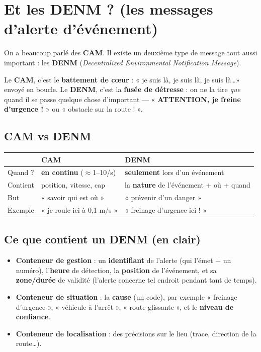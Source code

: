 \documentclass[a4paper,11pt]{article}
\begin{document}
\section{Et les DENM ? (les messages d'alerte d'événement)}
On a beaucoup parlé des \textbf{CAM}. Il existe un deuxième type de message tout
aussi important : les \textbf{DENM} (\emph{Decentralized Environmental Notification
Message}).

\begin{analogie}
Le \textbf{CAM}, c'est le \textbf{battement de cœur} : « je suis là, je suis là, je
suis là\ldots » envoyé en boucle. Le \textbf{DENM}, c'est la \textbf{fusée de
détresse} : on ne la tire \emph{que} quand il se passe quelque chose
d'important — « \textbf{ATTENTION, je freine d'urgence !} » ou « obstacle sur la
route ! ».
\end{analogie}

\subsection{CAM vs DENM}
\begin{center}
\begin{tabularx}{\textwidth}{@{}l X X@{}}
\toprule
 & \textbf{CAM} & \textbf{DENM} \\
\midrule
Quand ? & \textbf{en continu} ($\approx$1--10/s) & \textbf{seulement} lors d'un événement \\
Contient & position, vitesse, cap & la \textbf{nature} de l'événement + où + quand \\
But & « savoir qui est où » & « prévenir d'un danger » \\
Exemple & « je roule ici à 0,1 m/s » & « freinage d'urgence ici ! » \\
\bottomrule
\end{tabularx}
\end{center}

\subsection{Ce que contient un DENM (en clair)}
\begin{itemize}[leftmargin=1.4em, nosep]
  \item \textbf{Conteneur de gestion} : un \textbf{identifiant} de l'alerte (qui
        l'émet + un numéro), l'\textbf{heure} de détection, la \textbf{position} de
        l'événement, et sa \textbf{zone/durée} de validité (l'alerte concerne tel
        endroit pendant tant de temps).
  \item \textbf{Conteneur de situation} : la \textbf{cause} (un code), par exemple
        « freinage d'urgence », « véhicule à l'arrêt », « route glissante », et le
        \textbf{niveau de confiance}.
  \item \textbf{Conteneur de localisation} : des précisions sur le lieu (trace,
        direction de la route\ldots).
\end{itemize}
\end{document}
